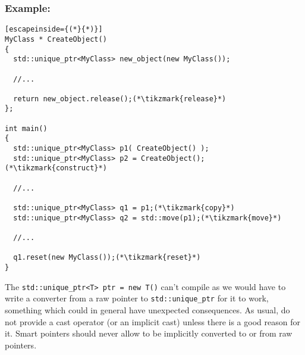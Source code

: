 \documentclass[11pt,a4paper,dvipsnames,usenames]{beamer}
\newcommand{\tikzmark}[1]{\tikz[overlay,remember picture] \node (#1) {};}
\newcommand{\std}[1]{{\ttfamily {\color{RoyalBlue} std::}{\color{OliveGreen}#1}}}
\newcommand{\uniqueptr}{\std{unique\_ptr}}
\begin{document}
\begin{frame}[fragile]
  \frametitle{Example: \uniqueptr{}}

  \begin{lstlisting}[escapeinside={(*}{*)}]
MyClass * CreateObject()
{
  std::unique_ptr<MyClass> new_object(new MyClass());

  //...

  return new_object.release();(*\tikzmark{release}*)
};

int main()
{
  std::unique_ptr<MyClass> p1( CreateObject() );
  std::unique_ptr<MyClass> p2 = CreateObject();(*\tikzmark{construct}*)

  //...

  std::unique_ptr<MyClass> q1 = p1;(*\tikzmark{copy}*)
  std::unique_ptr<MyClass> q2 = std::move(p1);(*\tikzmark{move}*)

  //...

  q1.reset(new MyClass());(*\tikzmark{reset}*)
}
  \end{lstlisting}


  \note
  {
    The \lstinline!std::unique_ptr<T> ptr = new T()! can't compile as we would have to write a
    converter from a raw pointer to \lstinline!std::unique_ptr! for it to work, something
    which could in general have unexpected consequences. As usual, do not provide a 
    cast operator (or an implicit cast) unless there is a good reason for it. Smart pointers
    should never allow to be implicitly converted to or from raw pointers.
  }

\end{frame}
\end{document}
